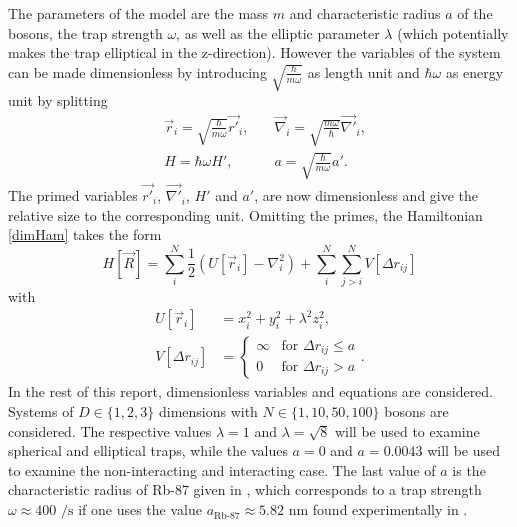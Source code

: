 \documentclass[a4paper,8pt]{article}
\begin{document}
\begin{multicols}{2}
The parameters of the model are the mass $m$ and characteristic radius $a$ of the bosons, the trap strength $\omega$, as well as the elliptic parameter $\lambda$ (which potentially makes the trap elliptical in the z-direction). However the variables of the system can be made dimensionless by introducing $\sqrt{\frac{\hbar}{m\omega}}$ as length unit and $\hbar\omega$ as energy unit by splitting
\begin{align}
&\vec{r}_i = \sqrt{\frac{\hbar}{m\omega}}\vec{r'}_i, \quad &\vec{\nabla}_i = \sqrt{\frac{m\omega}{\hbar}}\vec{\nabla'}_i, \nonumber\\
&H = \hbar\omega H', \quad\quad &a = \sqrt{\frac{\hbar}{m\omega}}a'. \nonumber
\end{align}
The primed variables $\vec{r'}_i$, $\vec{\nabla'}_i$, $H'$ and $a'$, are now dimensionless and give the relative size to the corresponding unit. Omitting the primes, the Hamiltonian \eqref{dimHam} takes the form
\begin{equation}\label{Ham}
H[\vec{R}] = \sum\limits_i^N \frac{1}{2}\left( U[\vec{r}_i] - {\nabla}_i^2\right) + \sum\limits_i^N\sum\limits_{j > i}^N V[\Delta{r}_{ij}]
\end{equation}
with
\begin{align}
U[\vec{r}_i] &= x_i^2+y_i^2+\lambda^2z_i^2, \label{U}\\
V[\Delta{r}_{ij}] &=\begin{cases} \infty & \text{for $\Delta{r}_{ij} \leq a$} \\
0 & \text{for $\Delta{r}_{ij} > a$} \end{cases}. \label{V}
\end{align}
In the rest of this report, dimensionless variables and equations are considered. Systems of $D \in \{1,2,3\}$ dimensions with $N \in \{1,10,50,100\}$ bosons are considered. The respective values $\lambda = 1$ and $\lambda = \sqrt{8}$ will be used to examine spherical and elliptical traps, while the values $a = 0$ and $a = 0.0043$ will be used to examine the non-interacting and interacting case. The last value of $a$ is the characteristic radius of Rb-87 given in \cite{DBG}, which corresponds to a trap strength $\omega \approx 400\text{ /s}$ if one uses the value $a_\text{Rb-87} \approx 5.82\text{ nm}$ found experimentally in \cite{BTGHV}.



\end{multicols}
\end{document}
